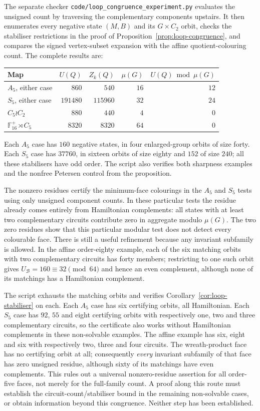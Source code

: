 \documentclass[11pt,a4paper]{article}
\theoremstyle{definition}
\theoremstyle{remark}
\begin{document}
The separate checker \nolinkurl{code/loop_congruence_experiment.py} evaluates the unsigned count by traversing the complementary components upstairs.  It then enumerates every negative state $(M,B)$ and its $G\times C_2$ orbit, checks the stabiliser restrictions in the proof of Proposition~\ref{prop:loop-congruence}, and compares the signed vertex-subset expansion with the affine quotient-colouring count.  The complete results are:
\begin{center}
\begin{tabular}{@{}lrrrr@{}}
\toprule
Map & $U(Q)$ & $Z_k(Q)$ & $\mu(G)$ & $U(Q)\bmod\mu(G)$\\
\midrule
$A_5$, either case & $860$ & $540$ & $16$ & $12$\\
$S_5$, either case & $191480$ & $115960$ & $32$ & $24$\\
$C_5\wr C_2$ & $880$ & $440$ & $4$ & $0$\\
$\mathbb F_{16}^{+}\rtimes C_5$ & $8320$ & $8320$ & $64$ & $0$\\
\bottomrule
\end{tabular}
\end{center}
Each $A_5$ case has $160$ negative states, in four enlarged-group orbits of size forty.  Each $S_5$ case has $37760$, in sixteen orbits of size eighty and $152$ of size $240$; all these stabilisers have odd order.  The script also verifies both sharpness examples and the nonfree Petersen control from the proposition.

The nonzero residues certify the minimum-face colourings in the $A_5$ and $S_5$ tests using only unsigned component counts.  In these particular tests the residue already comes entirely from Hamiltonian complements: all states with at least two complementary circuits contribute zero in aggregate modulo $\mu(G)$.  The two zero residues show that this particular modular test does not detect every colourable face.  There is still a useful refinement because any invariant subfamily is allowed.  In the affine order-eighty example, each of the six matching orbits with two complementary circuits has forty members; restricting to one such orbit gives $U_{\mathcal B}=160\equiv32\pmod{64}$ and hence an even complement, although none of its matchings has a Hamiltonian complement.

The script exhausts the matching orbits and verifies Corollary~\ref{cor:loop-stabiliser} on each.  Each $A_5$ case has six certifying orbits, all Hamiltonian.  Each $S_5$ case has $92$, $55$ and eight certifying orbits with respectively one, two and three complementary circuits, so the certificate also works without Hamiltonian complements in these non-solvable examples.  The affine example has six, eight and six with respectively two, three and four circuits.  The wreath-product face has no certifying orbit at all; consequently \emph{every} invariant subfamily of that face has zero unsigned residue, although sixty of its matchings have even complements.  This rules out a universal nonzero-residue assertion for all order-five faces, not merely for the full-family count.  A proof along this route must establish the circuit-count/stabiliser bound in the remaining non-solvable cases, or obtain information beyond this congruence.  Neither step has been established.
\end{document}
